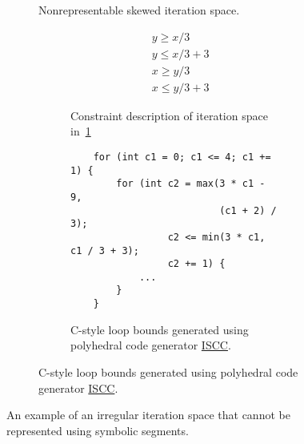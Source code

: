 \begin{figure}
	\begin{subfigure}{0.41\columnwidth}
	\caption{Nonrepresentable skewed iteration space.}\label{skewedIterationSpace}
	\end{subfigure}
	\hspace{0.01\columnwidth}
	\begin{subfigure}{0.5\columnwidth}
	\begin{subfigure}{\columnwidth}
	\begin{align}
		&y \geq x/3 \\
		&y \leq x/3 + 3 \\
		&x \geq y/3 \\
		&x \leq y/3 + 3
	\end{align}
	\caption{Constraint description of iteration space in~\ref{skewedIterationSpace}}\label{constraintDescription3}
	\end{subfigure}
	
	\vspace{10pt}

	\begin{subfigure}{\columnwidth}
	\begin{lstlisting}
	for (int c1 = 0; c1 <= 4; c1 += 1) {
		for (int c2 = max(3 * c1 - 9, 
		                  (c1 + 2) / 3); 
				 c2 <= min(3 * c1, c1 / 3 + 3); 
				 c2 += 1) {
			...
		}
	}
	\end{lstlisting}
	\caption{C-style loop bounds generated using polyhedral code generator \href{https://compsys-tools.ens-lyon.fr/iscc/index.php}{ISCC}.}\label{farkasResult}
	\end{subfigure}
	
	\end{subfigure}
	\caption{An example of an irregular iteration space that cannot be represented using symbolic segments.}\label{badShapes}
	\end{figure}
\begin{comment}
Domain := [n] -> {
	T[x,y] : y >= x/3 and y <= (x+9) / 3 and x >= y/3 and x <= (y+9) / 3;
};
Schedule := [n] -> {
    T[i, j] -> [1, i, j];
};
codegen (Schedule * Domain);
\end{comment}


